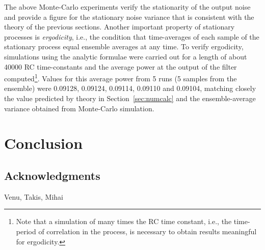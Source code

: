 The above Monte-Carlo experiments verify the stationarity of the output
noise and provide a figure for the stationary noise variance that is
consistent with the theory of the previous sections. Another important
property of stationary processes is {\em ergodicity},
i.e., the condition that time-averages of each sample of the stationary
process equal ensemble averages at any time. 
To verify ergodicity, simulations using the analytic formulae were carried out 
for a length of about 40000 RC time-constants and the average power at the
output of the filter
computed\footnote{Note that a simulation of many times the RC time constant,
i.e., the time-period of correlation in the process, is necessary to obtain
results meaningful for ergodicity.}. Values for this average power from 5
runs (5 samples from the ensemble) were 0.09128, 0.09124, 0.09114, 0.09110
and 0.09104, matching closely the value predicted by theory in
Section~\ref{sec:numcalc} and the ensemble-average variance obtained from
Monte-Carlo simulation.

\section{Conclusion}

\subsection*{Acknowledgments}
Venu, Takis, Mihai


